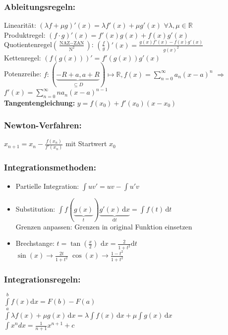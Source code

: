 \documentclass[6pt,a4paper]{scrartcl}
\newcommand{\enbrace}[1]{\ensuremath{\left(#1\right)}}
\newcommand{\R}{\ensuremath{\mathbb R}}
\begin{document}
\begin{multicols}{4}
\subsubsection{Ableitungsregeln:}
Linearität: $(\lambda f + \mu g)' (x) = \lambda f'(x) + \mu g'(x)$ \quad $\forall \lambda, \mu \in \R$ \\
Produktregel: $(f \cdot g)'(x) = f'(x) g(x) + f(x) g'(x)$\\
Quotientenregel$\enbrace{\frac{\text{NAZ}-\text{ZAN}}{\text{N}^2}}$: $\enbrace{\frac{f}{g}}' (x) = \frac{g(x)f'(x) -f(x) g'(x)}{g(x)^2}$\\
Kettenregel: $\left( f(g(x)) \right)' = f'(g(x)) g'(x)$\\
Potenzreihe: $f: (\underbrace{-R+a, a+R}_{\subseteq D}) \mapsto \R, f(x) = \sum\limits_{n=0}^{\infty} a_n (x -a)^n$ \quad $\Rightarrow$ \quad $f'(x) = \sum\limits_{n=0}^{\infty} n a_{n} (x-a)^{n-1}$\\
\textbf{Tangentengleichung:} $y=f(x_0)+f'(x_0)(x-x_0)$

\subsubsection{Newton-Verfahren:}
$x_{n+1}=x_n-\frac{f(x_n)}{f'(x_n)}$ mit Startwert $x_0$

\subsubsection{Integrationsmethoden:}
\begin{itemize}\itemsep0pt
\item Partielle Integration: $\int uv'=uv-\int u'v$
\item Substitution: $\int f(\underbrace {g(x)}_{t}) \underbrace {g'(x)\,\mathrm dx}_{\mathrm dt}=\int f(t)\, \mathrm dt$ \\
Grenzen anpassen: Grenzen in original Funktion einsetzen
\item Brechstange: $t=\tan(\frac{x}{2})$ \quad $\mathrm dx = \frac{2}{1+t^2} \mathrm dt$ \\ $\sin(x) \rightarrow \frac{2t}{1+t^2}$ \qquad $\cos(x) \rightarrow \frac{1-t^2}{1+t^2}$
\end{itemize}

\subsubsection{Integrationsregeln:}
$\int\limits_a^b f(x) \mathrm dx = F(b) - F(a)$\\
$\int\lambda f(x)+\mu g(x) \, \mathrm dx=\lambda\int f(x) \, \mathrm dx + \mu\int g(x) \, \mathrm dx$ \\
$\int x^n dx = \frac{1}{n+1}x^{n+1}+c$


\end{multicols}
\end{document}
